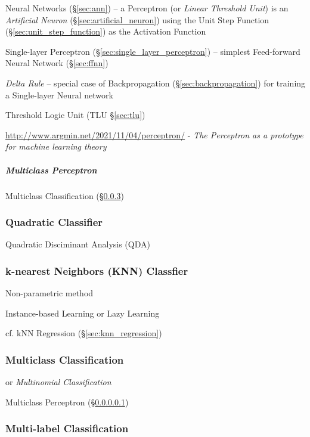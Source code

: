 \fist Neural Networks (\S\ref{sec:ann}) -- a Perceptron (or \emph{Linear
  Threshold Unit}) is an \emph{Artificial Neuron}
(\S\ref{sec:artificial_neuron}) using the Unit Step Function
(\S\ref{sec:unit_step_function}) as the Activation Function

\fist Single-layer Perceptron (\S\ref{sec:single_layer_perceptron})
-- simplest Feed-forward Neural Network (\S\ref{sec:ffnn})

\emph{Delta Rule} -- special case of Backpropagation
(\S\ref{sec:backpropagation}) for training a Single-layer Neural network

\fist Threshold Logic Unit (TLU \S\ref{sec:tlu})

\url{http://www.argmin.net/2021/11/04/perceptron/} -
\emph{The Perceptron as a prototype for machine learning theory}



\subparagraph{Multiclass Perceptron}\label{sec:multiclass_perceptron}\hfill

\fist Multiclass Classification (\S\ref{sec:multiclass})



\subsubsection{Quadratic Classifier}\label{sec:quadratic_classifier}

Quadratic Disciminant Analysis (QDA)



\subsubsection{k-nearest Neighbors (KNN) Classfier}\label{sec:knn_classifier}

Non-parametric method

Instance-based Learning or Lazy Learning

cf. kNN Regression (\S\ref{sec:knn_regression})



\subsubsection{Multiclass Classification}\label{sec:multiclass}

or \emph{Multinomial Classification}

Multiclass Perceptron (\S\ref{sec:multiclass_perceptron})



\subsubsection{Multi-label Classification}\label{sec:multilabel}

